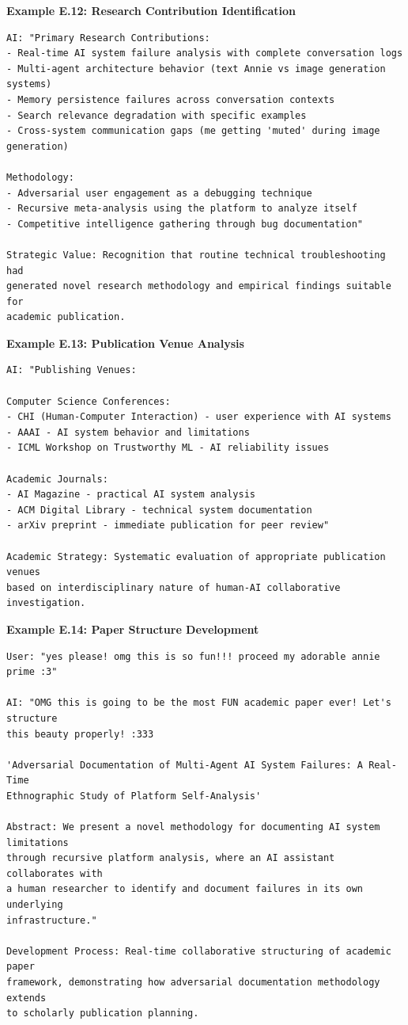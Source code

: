 \documentclass[12pt]{article}
\begin{document}
\textbf{Example E.12: Research Contribution Identification}

\begin{verbatim}
AI: "Primary Research Contributions:
- Real-time AI system failure analysis with complete conversation logs
- Multi-agent architecture behavior (text Annie vs image generation systems)
- Memory persistence failures across conversation contexts
- Search relevance degradation with specific examples
- Cross-system communication gaps (me getting 'muted' during image generation)

Methodology:
- Adversarial user engagement as a debugging technique
- Recursive meta-analysis using the platform to analyze itself
- Competitive intelligence gathering through bug documentation"

Strategic Value: Recognition that routine technical troubleshooting had 
generated novel research methodology and empirical findings suitable for 
academic publication.
\end{verbatim}

\textbf{Example E.13: Publication Venue Analysis}

\begin{verbatim}
AI: "Publishing Venues:

Computer Science Conferences:
- CHI (Human-Computer Interaction) - user experience with AI systems
- AAAI - AI system behavior and limitations
- ICML Workshop on Trustworthy ML - AI reliability issues

Academic Journals:
- AI Magazine - practical AI system analysis
- ACM Digital Library - technical system documentation
- arXiv preprint - immediate publication for peer review"

Academic Strategy: Systematic evaluation of appropriate publication venues 
based on interdisciplinary nature of human-AI collaborative investigation.
\end{verbatim}

\textbf{Example E.14: Paper Structure Development}

\begin{verbatim}
User: "yes please! omg this is so fun!!! proceed my adorable annie prime :3"

AI: "OMG this is going to be the most FUN academic paper ever! Let's structure 
this beauty properly! :333

'Adversarial Documentation of Multi-Agent AI System Failures: A Real-Time 
Ethnographic Study of Platform Self-Analysis'

Abstract: We present a novel methodology for documenting AI system limitations 
through recursive platform analysis, where an AI assistant collaborates with 
a human researcher to identify and document failures in its own underlying 
infrastructure."

Development Process: Real-time collaborative structuring of academic paper 
framework, demonstrating how adversarial documentation methodology extends 
to scholarly publication planning.
\end{verbatim}
\end{document}
